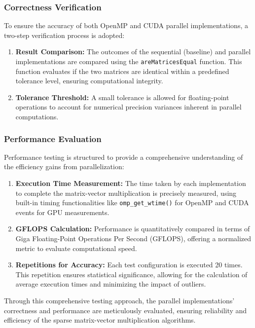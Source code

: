 \documentclass[12pt,oneside]{book} %
\begin{document}
\subsubsection{Correctness Verification}

To ensure the accuracy of both OpenMP and CUDA parallel implementations, a
two-step verification process is adopted:
\begin{enumerate}
    \item \textbf{Result Comparison:} The outcomes of the sequential (baseline) and parallel implementations are compared using the \texttt{areMatricesEqual} function. This function evaluates if the two matrices are identical within a predefined tolerance level, ensuring computational integrity.
    \item \textbf{Tolerance Threshold:} A small tolerance is allowed for floating-point operations to account for numerical precision variances inherent in parallel computations.
\end{enumerate}

\subsubsection{Performance Evaluation}

Performance testing is structured to provide a comprehensive understanding of
the efficiency gains from parallelization:
\begin{enumerate}
    \item \textbf{Execution Time Measurement:} The time taken by each implementation to complete the matrix-vector multiplication is precisely measured, using built-in timing functionalities like \texttt{omp\_get\_wtime()} for OpenMP and CUDA events for GPU measurements.
    \item \textbf{GFLOPS Calculation:} Performance is quantitatively compared in terms of Giga Floating-Point Operations Per Second (GFLOPS), offering a normalized metric to evaluate computational speed.
    \item \textbf{Repetitions for Accuracy:} Each test configuration is executed 20 times. This repetition ensures statistical significance, allowing for the calculation of average execution times and minimizing the impact of outliers.
\end{enumerate}

Through this comprehensive testing approach, the parallel implementations'
correctness and performance are meticulously evaluated, ensuring reliability
and efficiency of the sparse matrix-vector multiplication algorithms.
\end{document}
